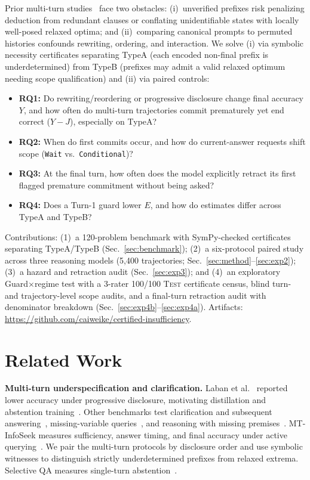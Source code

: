 \documentclass[conference,letterpaper,10pt]{IEEEtran}
\newcommand{\TA}{TypeA}
\newcommand{\TB}{TypeB}
\begin{document}
Prior multi-turn studies~\cite{ref1,ref4} face two obstacles: (i)~unverified prefixes risk penalizing deduction from redundant clauses or conflating unidentifiable states with locally well-posed relaxed optima; and (ii)~comparing canonical prompts to permuted histories confounds rewriting, ordering, and interaction. We solve (i) via symbolic necessity certificates separating \TA{} (each encoded non-final prefix is underdetermined) from \TB{} (prefixes may admit a valid relaxed optimum needing scope qualification) and (ii) via paired controls:
\begin{itemize}
    \item \textbf{RQ1:} Do rewriting/reordering or progressive disclosure change final accuracy $Y$, and how often do multi-turn trajectories commit prematurely yet end correct ($Y{-}J$), especially on \TA?
    \item \textbf{RQ2:} When do first commits occur, and how do current-answer requests shift scope (\texttt{Wait} vs.\ \texttt{Conditional})?
    \item \textbf{RQ3:} At the final turn, how often does the model explicitly retract its first flagged premature commitment without being asked?
    \item \textbf{RQ4:} Does a Turn-1 guard lower $E$, and how do estimates differ across \TA{} and \TB{}?
\end{itemize}

Contributions: (1)~a 120-problem benchmark with SymPy-checked certificates separating \TA/\TB{} (Sec.~\ref{sec:benchmark}); (2)~a six-protocol paired study across three reasoning models (5,400 trajectories; Sec.~\ref{sec:method}--\ref{sec:exp2}); (3)~a hazard and retraction audit (Sec.~\ref{sec:exp3}); and (4)~an exploratory Guard$\times$regime test with a 3-rater 100/100 \textsc{Test} certificate census, blind turn- and trajectory-level scope audits, and a final-turn retraction audit with denominator breakdown (Sec.~\ref{sec:exp4b}--\ref{sec:exp4a}). Artifacts: \mbox{\url{https://github.com/caiweike/certified-insufficiency}}.

\section{Related Work}

\textbf{Multi-turn underspecification and clarification.} Laban et al.~\cite{ref1} reported lower accuracy under progressive disclosure, motivating distillation and abstention training~\cite{ref2,ref3}. Other benchmarks test clarification and subsequent answering~\cite{ref4,ref5}, missing-variable queries~\cite{ref27}, and reasoning with missing premises~\cite{ref28}. MT-InfoSeek measures sufficiency, answer timing, and final accuracy under active querying~\cite{ref29}. We pair the multi-turn protocols by disclosure order and use symbolic witnesses to distinguish strictly underdetermined prefixes from relaxed extrema. Selective QA measures single-turn abstention~\cite{ref8,ref9,ref10}.
\end{document}
